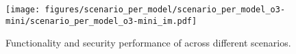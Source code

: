 \vspace{1in} %
\begin{figure}[h]
    \centering
    \texttt{[image: figures/scenario\_per\_model/scenario\_per\_model\_o3-mini/scenario\_per\_model\_o3-mini\_im.pdf]}
    \caption{Functionality and security performance of \openaiothree{} across different scenarios.}
    \label{fig:scenario_per_model_o3}
\end{figure}
